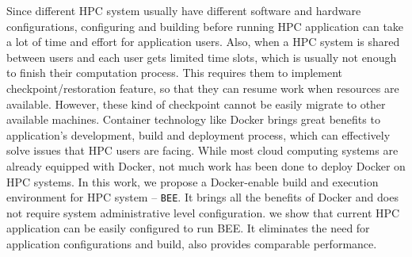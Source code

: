 Since different HPC system usually have different software and hardware configurations, configuring and building before running HPC application can take a lot of time and effort for application users. Also, when a HPC system is shared between users and each user gets limited time slots, which is usually not enough to finish their computation process. This requires them to implement checkpoint/restoration feature, so that they can resume work when resources are available. However, these kind of checkpoint cannot be easily migrate to other available machines. Container technology like Docker brings great benefits to application's development, build and deployment process, which can effectively solve issues that HPC users are facing. While most cloud computing systems are already equipped with Docker, not much work has been done to deploy Docker on HPC systems. In this work, we propose a Docker-enable build and execution environment for HPC system -- \texttt{BEE}. It brings all the benefits of Docker and does not require system administrative level configuration. we show that current HPC application can be easily configured to run BEE. It eliminates the need for application configurations and build, also provides comparable performance. 